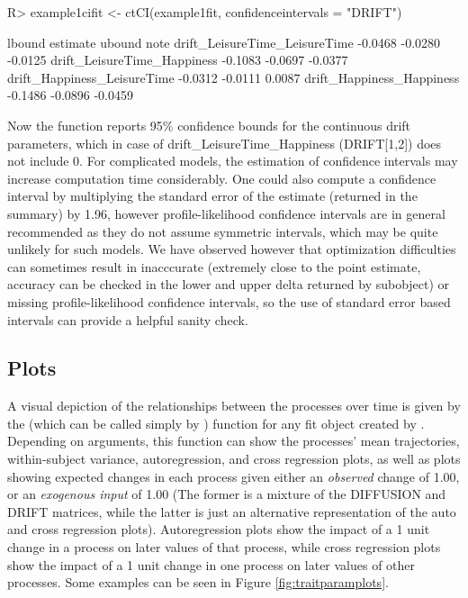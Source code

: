 \documentclass[nojss]{jss}\usepackage[]{graphicx}\usepackage[]{color}
\begin{document}
\begin{Schunk}
\begin{Sinput}
R> example1cifit <- ctCI(example1fit, confidenceintervals = "DRIFT")
\end{Sinput}
\begin{Soutput}
                               lbound estimate  ubound note
drift_LeisureTime_LeisureTime -0.0468  -0.0280 -0.0125     
drift_LeisureTime_Happiness   -0.1083  -0.0697 -0.0377     
drift_Happiness_LeisureTime   -0.0312  -0.0111  0.0087     
drift_Happiness_Happiness     -0.1486  -0.0896 -0.0459     
\end{Soutput}
\end{Schunk}

Now the  function reports 95\% confidence bounds for the continuous drift parameters, which in case of drift\_LeisureTime\_Happiness (DRIFT[1,2]) does not include 0. For complicated models, the estimation of confidence intervals may increase computation time considerably.  One could also compute a confidence interval by multiplying the standard error of the estimate (returned in the summary) by 1.96, however profile-likelihood confidence intervals are in general recommended as they do not assume symmetric intervals, which may be quite unlikely for such models. We have observed however that optimization difficulties can sometimes result in inacccurate (extremely close to the point estimate, accuracy can be checked in the lower and upper delta returned by  subobject) or missing profile-likelihood confidence intervals, so the use of standard error based intervals can provide a helpful sanity check. 

\subsection{Plots}\nopagebreak
A visual depiction of the relationships between the processes over time is given by the  (which can be called simply by ) function for any fit object created by . Depending on arguments, this function can show the processes' mean trajectories, within-subject variance, autoregression, and cross regression plots, as well as plots showing expected changes in each process given either an \textit{observed} change of 1.00, or an \textit{exogenous input} of 1.00 (The former is a mixture of the DIFFUSION and DRIFT matrices, while the latter is just an alternative representation of the auto and cross regression plots). Autoregression plots show the impact of a 1 unit change in a process on later values of that process, while cross regression plots show the impact of a 1 unit change in one process on later values of other processes. Some examples can be seen in Figure \ref{fig:traitparamplots}.
\end{document}
